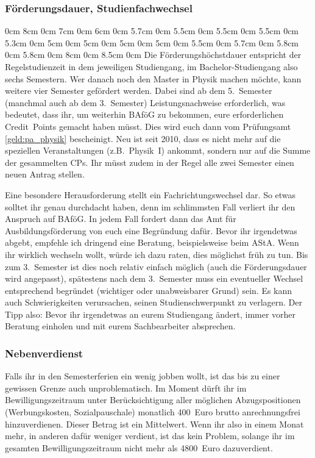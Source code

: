 \begin{multicols*}{2}
\subsubsection*{Förderungsdauer, Studienfachwechsel}
0cm \columnwidth
0cm \columnwidth
0cm \columnwidth
0cm \columnwidth
0cm 8cm
0cm 7cm
0cm 6cm
0cm 5.7cm
0cm 5.5cm
0cm 5.5cm
0cm 5.5cm
0cm 5.3cm
0cm 5cm
0cm 5cm
0cm 5cm
0cm 5cm
0cm 5.5cm
0cm 5.7cm
0cm 5.8cm
0cm 5.8cm
0cm 8cm
0cm 8.5cm
0cm \columnwidth
Die Förderungshöchstdauer entspricht der Regelstudienzeit in dem jeweiligen Studiengang, im Bachelor-Studiengang also sechs Semestern. Wer danach noch den Master in Physik machen möchte, kann weitere vier Semester gefördert werden. Dabei sind ab dem 5.\ Semester (manchmal auch ab dem 3.\ Semester) Leistungsnachweise erforderlich, was bedeutet, dass ihr, um weiterhin BAföG zu bekommen, eure erforderlichen Credit~Points gemacht haben müsst. Dies wird euch dann vom Prüfungsamt \cref{geld:pa_physik} bescheinigt. Neu ist seit 2010, dass es nicht mehr auf die speziellen Veranstaltungen (z.B.\ Physik~I) ankommt, sondern nur auf die Summe der gesammelten CPs. Ihr müsst zudem in der Regel alle zwei Semester einen neuen Antrag stellen.

Eine besondere Herausforderung stellt ein Fachrichtungswechsel dar. So etwas solltet ihr genau durchdacht haben, denn im schlimmsten Fall verliert ihr den Anspruch auf BAföG. In jedem Fall fordert dann das Amt für Ausbildungsförderung von euch eine Begründung dafür. Bevor ihr irgendetwas abgebt, empfehle ich dringend eine Beratung, beispielsweise beim AStA. Wenn ihr wirklich wechseln wollt, würde ich dazu raten, dies möglichst früh zu tun. Bis zum 3.\ Semester ist dies noch relativ einfach möglich (auch die Förderungsdauer wird angepasst), spätestens nach dem 3.\ Semester muss ein eventueller Wechsel entsprechend begründet (wichtiger oder unabweisbarer Grund) sein. Es kann auch Schwierigkeiten verursachen, seinen Studienschwerpunkt zu verlagern. Der Tipp also: Bevor ihr irgendetwas an eurem Studiengang ändert, immer vorher Beratung einholen und mit eurem Sachbearbeiter absprechen.

\subsubsection*{Nebenverdienst}
Falls ihr in den Semesterferien ein wenig jobben wollt, ist das bis zu einer gewissen Grenze auch unproblematisch. Im Moment dürft ihr im Bewilligungszeitraum unter Berücksichtigung aller möglichen Abzugspositionen (Werbungskosten, Sozialpauschale) monatlich 400~Euro brutto anrechnungsfrei hinzuverdienen. Dieser Betrag ist ein Mittelwert. Wenn ihr also in einem Monat mehr, in anderen dafür weniger verdient, ist das kein Problem, solange ihr im gesamten Bewilligungszeitraum nicht mehr als \num{4800}~Euro dazuverdient.


\end{multicols*}
